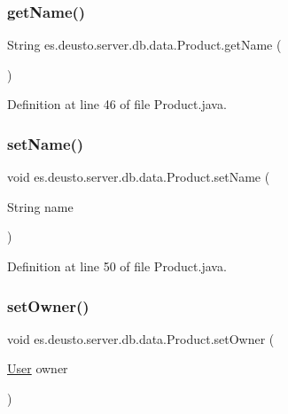 \subsubsection{\texorpdfstring{get\+Name()}{getName()}}
{\footnotesize\ttfamily String es.\+deusto.\+server.\+db.\+data.\+Product.\+get\+Name (\begin{DoxyParamCaption}{ }\end{DoxyParamCaption})}



Definition at line 46 of file Product.\+java.

\mbox{\label{classes_1_1deusto_1_1server_1_1db_1_1data_1_1_product_a68feb5bdb4b611fecd9c07eee9217ac6}} 
\subsubsection{\texorpdfstring{set\+Name()}{setName()}}
{\footnotesize\ttfamily void es.\+deusto.\+server.\+db.\+data.\+Product.\+set\+Name (\begin{DoxyParamCaption}\item[{String}]{name }\end{DoxyParamCaption})}



Definition at line 50 of file Product.\+java.

\mbox{\label{classes_1_1deusto_1_1server_1_1db_1_1data_1_1_product_a72a7c230f6309248b5f6e6027189c996}} 
\subsubsection{\texorpdfstring{set\+Owner()}{setOwner()}}
{\footnotesize\ttfamily void es.\+deusto.\+server.\+db.\+data.\+Product.\+set\+Owner (\begin{DoxyParamCaption}\item[{\hyperlink{classes_1_1deusto_1_1server_1_1db_1_1data_1_1_user}{User}}]{owner }\end{DoxyParamCaption})}



